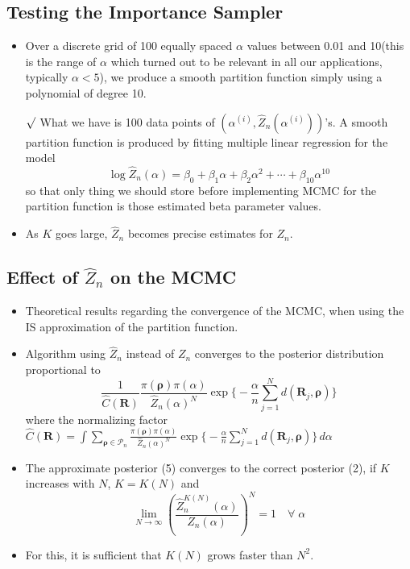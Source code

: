 \documentclass[12pt]{article}
\newcommand{\rmk}{$\surd$}
\begin{document}
\subsection{Testing the Importance Sampler}
\begin{itemize}
    \item Over a discrete grid of 100 equally spaced $\alpha$ values between 0.01 and 10(this is the range of $\alpha$ which turned out to be relevant in all our applications, typically $\alpha<5$), we produce a smooth partition function simply using a polynomial of degree 10.
    \item[\rmk] What we have is 100 data points of $(\alpha^{(i)}, \hat Z_n(\alpha^{(i)}))$'s. A smooth partition function is produced by fitting multiple linear regression for the model $$\log \hat Z_n(\alpha)=\beta_0+\beta_1 \alpha+\beta_2 \alpha^2+\cdots+\beta_{10} \alpha^{10}$$ so that only thing we should store before implementing MCMC for the partition function is those estimated beta parameter values.
    \item As $K$ goes large, $\hat{Z}_n$ becomes precise estimates for $Z_n$.  
\end{itemize}
\subsection{Effect of $\hat{Z}_n$ on the MCMC}
\begin{itemize}
    \item Theoretical results regarding the convergence of the MCMC, when using the IS approximation of the partition function.
    \item Algorithm using $\hat{Z}_n$ instead of $Z_n$ converges to the posterior distribution proportional to \begin{equation} \frac{1}{\hat{C}(\mathbf{R})}\frac{\pi(\boldsymbol{\rho})\pi(\alpha)}{\hat{Z}_n(\alpha)^N} \exp \big\{-\frac{\alpha}{n}\sum_{j=1}^N d(\mathbf{R}_j, \boldsymbol{\rho})\big\} \end{equation} where the normalizing factor $\hat{C}(\mathbf{R})=\int\sum_{\boldsymbol{\rho}\in \mathcal{P}_n}\frac{\pi(\boldsymbol{\rho})\pi(\alpha)}{\hat{Z}_n(\alpha)^N} \exp \big\{-\frac{\alpha}{n}\sum_{j=1}^N d(\mathbf{R}_j, \boldsymbol{\rho})\big\}\, d\alpha $
    \item The approximate posterior (5) converges to the correct posterior (2), if $K$ increases with $N$, $K=K(N)$ and $$\lim_{N \to \infty}(\frac{\hat{Z}_n^{K(N)}(\alpha)}{Z_n(\alpha)})^N =1 \quad \forall \; \alpha$$
    \item For this, it is sufficient that $K(N)$ grows faster than $N^2$.
\end{itemize}
\end{document}
